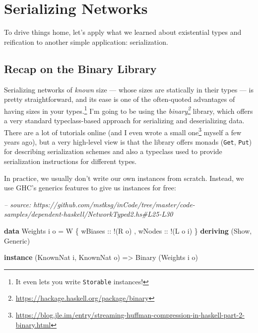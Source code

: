 \documentclass[]{article}
\newenvironment{Shaded}{}{}
\newcommand{\CommentTok}[1]{\textcolor[rgb]{0.38,0.63,0.69}{\textit{#1}}}
\newcommand{\DataTypeTok}[1]{\textcolor[rgb]{0.56,0.13,0.00}{#1}}
\newcommand{\FunctionTok}[1]{\textcolor[rgb]{0.02,0.16,0.49}{#1}}
\newcommand{\KeywordTok}[1]{\textcolor[rgb]{0.00,0.44,0.13}{\textbf{#1}}}
\newcommand{\NormalTok}[1]{#1}
\newcommand{\OtherTok}[1]{\textcolor[rgb]{0.00,0.44,0.13}{#1}}
\renewcommand{\href}[2]{#2\footnote{\url{#1}}}
\begin{document}
\hypertarget{serializing-networks}{%
\section{Serializing Networks}\label{serializing-networks}}

To drive things home, let's apply what we learned about existential types and
reification to another simple application: serialization.

\hypertarget{recap-on-the-binary-library}{%
\subsection{Recap on the Binary Library}\label{recap-on-the-binary-library}}

Serializing networks of \emph{known} size --- whose sizes are statically in
their types --- is pretty straightforward, and its ease is one of the
often-quoted advantages of having sizes in your types.\footnote{It even lets you
  write \texttt{Storable} instances!} I'm going to be using the
\emph{\href{https://hackage.haskell.org/package/binary}{binary}} library, which
offers a very standard typeclass-based approach for serializing and
deserializing data. There are a lot of tutorials online (and I even
\href{https://blog.jle.im/entry/streaming-huffman-compression-in-haskell-part-2-binary.html}{wrote
a small one} myself a few years ago), but a very high-level view is that the
library offers monads (\texttt{Get}, \texttt{Put}) for describing serialization
schemes and also a typeclass used to provide serialization instructions for
different types.

In practice, we usually don't write our own instances from scratch. Instead, we
use GHC's generics features to give us instances for free:

\begin{Shaded}
\begin{Highlighting}[]
\CommentTok{-- source: https://github.com/mstksg/inCode/tree/master/code-samples/dependent-haskell/NetworkTyped2.hs#L25-L30}

\KeywordTok{data} \DataTypeTok{Weights}\NormalTok{ i o }\FunctionTok{=} \DataTypeTok{W}\NormalTok{ \{}\OtherTok{ wBiases ::} \FunctionTok{!}\NormalTok{(}\DataTypeTok{R}\NormalTok{ o)}
\NormalTok{                     ,}\OtherTok{ wNodes  ::} \FunctionTok{!}\NormalTok{(}\DataTypeTok{L}\NormalTok{ o i)}
\NormalTok{                     \}}
  \KeywordTok{deriving}\NormalTok{ (}\DataTypeTok{Show}\NormalTok{, }\DataTypeTok{Generic}\NormalTok{)}

\KeywordTok{instance}\NormalTok{ (}\DataTypeTok{KnownNat}\NormalTok{ i, }\DataTypeTok{KnownNat}\NormalTok{ o) }\OtherTok{=>} \DataTypeTok{Binary}\NormalTok{ (}\DataTypeTok{Weights}\NormalTok{ i o)}
\end{Highlighting}
\end{Shaded}
\end{document}
